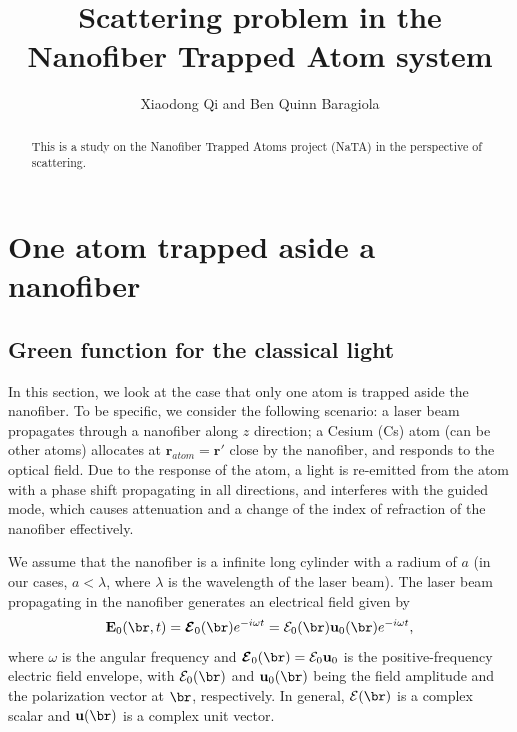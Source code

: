 \documentclass[]{report}
\title{Scattering problem in the Nanofiber Trapped Atom system}
\author{Xiaodong Qi and Ben Quinn Baragiola}
\begin{document}
\maketitle

\begin{abstract}
This is a study on the Nanofiber Trapped Atoms project (NaTA) in the perspective of scattering. 
\end{abstract}












\chapter{One atom trapped aside a nanofiber}

\section{Green function for the classical light}
In this section, we look at the case that only one atom is trapped aside the nanofiber. To be specific, we consider the following scenario: a laser beam propagates through a nanofiber along $ z $ direction; a Cesium (Cs) atom (can be other atoms) allocates at $ \mathbf{r}_{atom} =\mathbf{r}'$ close by the nanofiber, and responds to the optical field. Due to the response of the atom, a light is re-emitted
from the atom with a phase shift propagating in all directions, and interferes with the guided mode, which causes attenuation and a change of the index of refraction of the nanofiber effectively. 

We assume that the nanofiber is a infinite long cylinder with a radium of $ a $ (in our cases, $ a<\lambda $, where $ \lambda $ is the wavelength of the laser beam). The laser beam propagating in the nanofiber generates an electrical field given by
\begin{equation}
\mathbf{E}_0(\br,t)=\boldsymbol{\mathcal{E}}_0(\br)e^{-i\omega t} %
=\mathcal{E}_0(\br)\mathbf{u}_0(\br)e^{-i\omega t}, %
\label{Ert0}
\end{equation}
where $\omega$ is the angular frequency and $\boldsymbol{\mathcal{E}}_0(\br)=\mathcal{E}_0\mathbf{u}_0$ is the positive-frequency electric field envelope,
with $\mathcal{E}_0(\br)$ and $\mathbf{u}_0(\br)$ being the field amplitude and the polarization vector at $ \br $, respectively.
In general, $\mathcal{E}(\br)$ is a complex scalar and $\mathbf{u}(\br)$ is a complex unit vector. 
\end{document}
